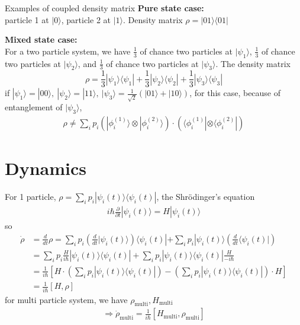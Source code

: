 \documentclass[UTF8,12pt]{article} %
\begin{document}
\begin{myboxes}{Examples of coupled density matrix}{}
\textbf{Pure state case:}\\particle 1 at $|0\rangle$, particle 2 at $|1\rangle$. Density matrix $\rho = |01\rangle\langle 01|$\\\par
\textbf{Mixed state case:}\\For a two particle system, we have $\frac{1}{3}$ of chance two particles at $|\psi_{1}\rangle$, $\frac{1}{3}$ of chance two particles at $|\psi_{2}\rangle$, and $\frac{1}{3}$ of chance two particles at $|\psi_{3}\rangle$. The density matrix
$$\rho = \frac{1}{3}|\psi_{1}\rangle\langle\psi_{1}| + \frac{1}{3}|\psi_{2}\rangle\langle\psi_{2}| + \frac{1}{3}|\psi_{3}\rangle\langle\psi_{3}|$$
if $|\psi_{1}\rangle = |00\rangle,~ |\psi_{2}\rangle = |11\rangle,~ |\psi_{3}\rangle = \frac{1}{\sqrt{2}}(|01\rangle + |10\rangle)$, for this case, because of entanglement of $|\psi_{3}\rangle$,
\begin{align}
\rho \ne \sum_{i} p_{i}\left(|\phi_{i}^{(1)}\rangle \otimes |\phi_{i}^{(2)}\rangle\right) \cdot \left(\langle\phi_{i}^{(1)}|\otimes\langle\phi_{i}^{(2)}|\right)
\end{align}
\end{myboxes}

\section{Dynamics}

For 1 particle, $\rho = \sum_{i} p_{i} |\psi_{i}(t)\rangle\langle\psi_{i}(t)|$, the Shr\"{o}dinger's equation
\begin{align}
i\hbar\frac{\partial}{\partial t}|\psi_{i}(t)\rangle = H|\psi_{i}(t)\rangle
\end{align}
so
\begin{align}
\dot{\rho} &= \frac{d}{dt} \rho = \sum_{i} p_{i}\left(\frac{d}{dt}|\psi_{i}(t)\rangle\right)\langle\psi_{i}(t)| + \sum_{i}p_{i}|\psi_{i}(t)\rangle \left(\frac{d}{dt}\langle\psi_{i}(t)|\right) \\
&= \sum_{i}p_{i}\frac{H}{i\hbar} |\psi_{i}(t)\rangle\langle\psi_{i}(t)| + \sum_{i}p_{i}|\psi_{i}(t)\rangle\langle\psi_{i}(t)|\frac{H}{-i\hbar} \\
&= \frac{1}{i\hbar} \left[H \cdot \left(\sum_{i}p_{i}|\psi_{i}(t)\rangle\langle\psi_{i}(t)|\right) - \left(\sum_{i}p_{i}|\psi_{i}(t)\rangle\langle\psi_{i}(t)|\right)\cdot H\right] \\
&= \frac{1}{i\hbar} [H,\rho]
\end{align}
for multi particle system, we have $\rho_{\text{multi}}, H_{\text{multi}}$
\begin{align}
\Rightarrow \dot{\rho}_{\text{multi}} = \frac{1}{i\hbar}[H_{\text{multi}},\rho_{\text{multi}}]
\end{align}
\end{document}
